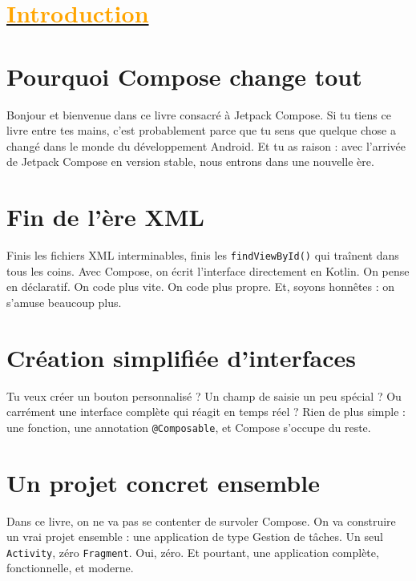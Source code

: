 \section{\hyperref[sec:sommaire]{\textcolor{orange}{Introduction}}}\label{sec:intro}

\noindent
\noindent
\begin{minipage}[t]{0.48\textwidth}
\section*{Pourquoi Compose change tout}

Bonjour et bienvenue dans ce livre consacré à Jetpack Compose.  
Si tu tiens ce livre entre tes mains, c’est probablement parce que tu sens que quelque chose a changé dans le monde du développement Android.  
Et tu as raison : avec l’arrivée de Jetpack Compose en version stable, nous entrons dans une nouvelle ère.  

\vspace{2em} %

\section*{Fin de l’ère XML}

Finis les fichiers XML interminables, finis les \texttt{findViewById()} qui traînent dans tous les coins.  
Avec Compose, on écrit l’interface directement en Kotlin.  
On pense en déclaratif.  
On code plus vite.  
On code plus propre.  
Et, soyons honnêtes : on s’amuse beaucoup plus.  
\end{minipage}
\hfill
\begin{minipage}[t]{0.48\textwidth}
\section*{Création simplifiée d’interfaces}

Tu veux créer un bouton personnalisé ?  
Un champ de saisie un peu spécial ?  
Ou carrément une interface complète qui réagit en temps réel ?  
Rien de plus simple : une fonction, une annotation \texttt{@Composable}, et Compose s’occupe du reste.  

\vspace{2em} %

\section*{Un projet concret ensemble}

Dans ce livre, on ne va pas se contenter de survoler Compose.  
On va construire un vrai projet ensemble : une application de type Gestion de tâches.  
Un seul \texttt{Activity}, zéro \texttt{Fragment}. Oui, zéro.  
Et pourtant, une application complète, fonctionnelle, et moderne.  
\end{minipage}
